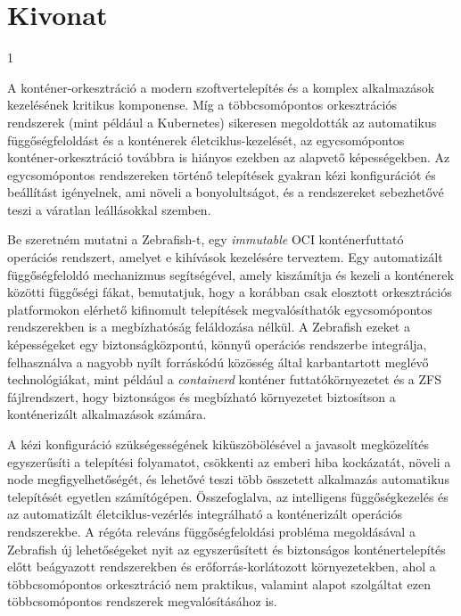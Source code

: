 
\hungarianParagraph


\chapter*{Kivonat}
\begin{spacing}{1}

A konténer-orkesztráció a modern szoftvertelepítés és a komplex alkalmazások kezelésének kritikus komponense. Míg a többcsomópontos orkesztrációs rendszerek (mint például a Kubernetes) sikeresen megoldották az automatikus függőségfeloldást és a konténerek életciklus-kezelését, az egycsomópontos konténer-orkesztráció továbbra is hiányos ezekben az alapvető képességekben. Az egycsomópontos rendszereken történő telepítések gyakran kézi konfigurációt és beállítást igényelnek, ami növeli a bonyolultságot, és a rendszereket sebezhetővé teszi a váratlan leállásokkal szemben.

Be szeretném mutatni a Zebrafish-t, egy \textit{immutable} OCI konténerfuttató operációs rendszert, amelyet e kihívások kezelésére terveztem. Egy automatizált függőségfeloldó mechanizmus segítségével, amely kiszámítja és kezeli a konténerek közötti függőségi fákat, bemutatjuk, hogy a korábban csak elosztott orkesztrációs platformokon elérhető kifinomult telepítések megvalósíthatók egycsomópontos rendszerekben is a megbízhatóság feláldozása nélkül. A Zebrafish ezeket a képességeket egy biztonságközpontú, könnyű operációs rendszerbe integrálja, felhasználva a nagyobb nyílt forráskódú közösség által karbantartott meglévő technológiákat, mint például a \textit{containerd} konténer futtatókörnyezetet és a ZFS fájlrendszert, hogy biztonságos és megbízható környezetet biztosítson a konténerizált alkalmazások számára.

A kézi konfiguráció szükségességének kiküszöbölésével a javasolt megközelítés egyszerűsíti a telepítési folyamatot, csökkenti az emberi hiba kockázatát, növeli a node megfigyelhetőségét, és lehetővé teszi több összetett alkalmazás automatikus telepítését egyetlen számítógépen. Összefoglalva, az intelligens függőségkezelés és az automatizált életciklus-vezérlés integrálható a konténerizált operációs rendszerekbe. A régóta releváns függőségfeloldási probléma megoldásával a Zebrafish új lehetőségeket nyit az egyszerűsített és biztonságos konténertelepítés előtt beágyazott rendszerekben és erőforrás-korlátozott környezetekben, ahol a többcsomópontos orkesztráció nem praktikus, valamint alapot szolgáltat ezen többcsomópontos rendszerek megvalósításához is.


\end{spacing}
